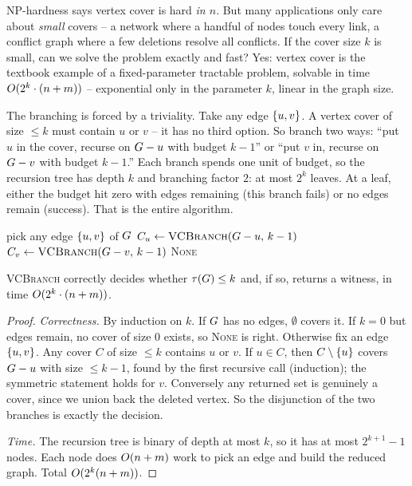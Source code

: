 NP-hardness says vertex cover is hard \emph{in $n$}. But many applications only
care about \emph{small} covers -- a network where a handful of nodes touch every
link, a conflict graph where a few deletions resolve all conflicts. If the cover
size $k$ is small, can we solve the problem exactly and fast? Yes: vertex cover
is the textbook example of a fixed-parameter tractable problem, solvable in time
$O(2^k\cdot (n+m))$ -- exponential only in the parameter $k$, linear in the
graph size.

\begin{intuitionbox}
The branching is forced by a triviality. Take any edge $\{u,v\}$. A vertex
cover of size $\le k$ must contain $u$ or $v$ -- it has no third option. So
branch two ways: ``put $u$ in the cover, recurse on $G-u$ with budget $k-1$''
or ``put $v$ in, recurse on $G-v$ with budget $k-1$.'' Each branch spends one
unit of budget, so the recursion tree has depth $k$ and branching factor $2$: at
most $2^k$ leaves. At a leaf, either the budget hit zero with edges remaining
(this branch fails) or no edges remain (success). That is the entire algorithm.
\end{intuitionbox}

\begin{algorithm}[H]
\caption{\textsc{VCBranch}$(\Gph,k)$ -- decide vertex cover $\le k$}
\label{ch29:alg-vcbranch}
\DontPrintSemicolon
{}
pick any edge $\{u,v\}$ of $G$\;
$C_u\leftarrow\textsc{VCBranch}(G-u,\,k-1)$\;
$C_v\leftarrow\textsc{VCBranch}(G-v,\,k-1)$\;
\Return \textsc{None}\;
\end{algorithm}

\begin{theorem}
\label{ch29:thm-fpt}
\textsc{VCBranch} correctly decides whether $\tau(G)\le k$ and, if so, returns
a witness, in time $O(2^k\cdot(n+m))$.
\end{theorem}

\begin{proof}
\emph{Correctness.} By induction on $k$. If $G$ has no edges, $\emptyset$
covers it. If $k=0$ but edges remain, no cover of size $0$ exists, so
\textsc{None} is right. Otherwise fix an edge $\{u,v\}$. Any cover $C$ of size
$\le k$ contains $u$ or $v$. If $u\in C$, then $C\setminus\{u\}$ covers
$G-u$ with size $\le k-1$, found by the first recursive call (induction); the
symmetric statement holds for $v$. Conversely any returned set is genuinely a
cover, since we union back the deleted vertex. So the disjunction of the two
branches is exactly the decision.

\emph{Time.} The recursion tree is binary of depth at most $k$, so it has at most
$2^{k+1}-1$ nodes. Each node does $O(n+m)$ work to pick an edge and build the
reduced graph. Total $O(2^k(n+m))$.
\end{proof}

